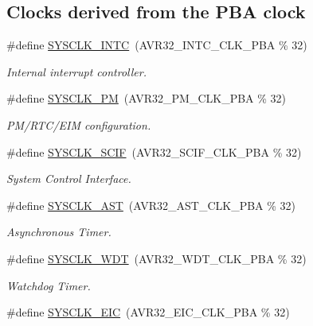\subsection*{\-Clocks derived from the \-P\-B\-A clock}
\begin{DoxyCompactItemize}
\item 
\#define \hyperlink{group__sysclk__group_ga14d03e228f6f595a55e1a76040b8f169}{\-S\-Y\-S\-C\-L\-K\-\_\-\-I\-N\-T\-C}~(\-A\-V\-R32\-\_\-\-I\-N\-T\-C\-\_\-\-C\-L\-K\-\_\-\-P\-B\-A \% 32)
\begin{DoxyCompactList}\small\item\em \-Internal interrupt controller. \end{DoxyCompactList}\item 
\#define \hyperlink{group__sysclk__group_ga0f033dbcbfbd2fa9aadc748fb5c18165}{\-S\-Y\-S\-C\-L\-K\-\_\-\-P\-M}~(\-A\-V\-R32\-\_\-\-P\-M\-\_\-\-C\-L\-K\-\_\-\-P\-B\-A \% 32)
\begin{DoxyCompactList}\small\item\em \-P\-M/\-R\-T\-C/\-E\-I\-M configuration. \end{DoxyCompactList}\item 
\#define \hyperlink{group__sysclk__group_ga49fca3345f07667c997b5ad46db6245b}{\-S\-Y\-S\-C\-L\-K\-\_\-\-S\-C\-I\-F}~(\-A\-V\-R32\-\_\-\-S\-C\-I\-F\-\_\-\-C\-L\-K\-\_\-\-P\-B\-A \% 32)
\begin{DoxyCompactList}\small\item\em \-System \-Control \-Interface. \end{DoxyCompactList}\item 
\#define \hyperlink{group__sysclk__group_ga6ad9b260e783734ef0e28bb7ac4284a7}{\-S\-Y\-S\-C\-L\-K\-\_\-\-A\-S\-T}~(\-A\-V\-R32\-\_\-\-A\-S\-T\-\_\-\-C\-L\-K\-\_\-\-P\-B\-A \% 32)
\begin{DoxyCompactList}\small\item\em \-Asynchronous \-Timer. \end{DoxyCompactList}\item 
\#define \hyperlink{group__sysclk__group_gae1d87ae47bff0e2e4cab4b417cea4ab1}{\-S\-Y\-S\-C\-L\-K\-\_\-\-W\-D\-T}~(\-A\-V\-R32\-\_\-\-W\-D\-T\-\_\-\-C\-L\-K\-\_\-\-P\-B\-A \% 32)
\begin{DoxyCompactList}\small\item\em \-Watchdog \-Timer. \end{DoxyCompactList}\item 
\#define \hyperlink{group__sysclk__group_gaee7a1048c289fa9dd6abf99eaf64fc46}{\-S\-Y\-S\-C\-L\-K\-\_\-\-E\-I\-C}~(\-A\-V\-R32\-\_\-\-E\-I\-C\-\_\-\-C\-L\-K\-\_\-\-P\-B\-A \% 32)

\end{DoxyCompactItemize}
